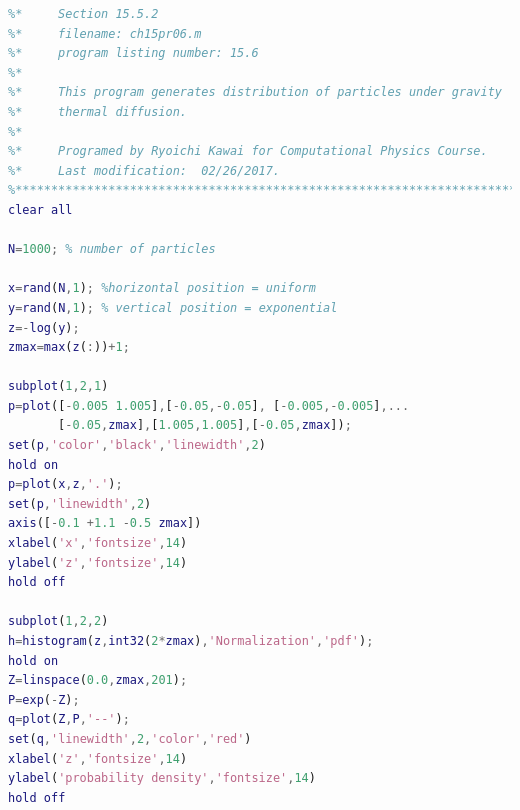 \bigskip
\noindent
\program
\label{prog:sediment}
\footnotesize
\begin{lstlisting}[language=matlab]
%**************************************************************************
%*     Section 15.5.2                                                     *
%*     filename: ch15pr06.m                                               *
%*     program listing number: 15.6                                       *
%*                                                                        *
%*     This program generates distribution of particles under gravity     *
%*     thermal diffusion.                                                 *
%*                                                                        *
%*     Programed by Ryoichi Kawai for Computational Physics Course.       *
%*     Last modification:  02/26/2017.                                    *
%**************************************************************************
clear all

N=1000; % number of particles

x=rand(N,1); %horizontal position = uniform
y=rand(N,1); % vertical position = exponential
z=-log(y);
zmax=max(z(:))+1;

subplot(1,2,1)
p=plot([-0.005 1.005],[-0.05,-0.05], [-0.005,-0.005],...
       [-0.05,zmax],[1.005,1.005],[-0.05,zmax]);
set(p,'color','black','linewidth',2)
hold on
p=plot(x,z,'.');
set(p,'linewidth',2)
axis([-0.1 +1.1 -0.5 zmax])
xlabel('x','fontsize',14)
ylabel('z','fontsize',14)
hold off

subplot(1,2,2)
h=histogram(z,int32(2*zmax),'Normalization','pdf');
hold on
Z=linspace(0.0,zmax,201);
P=exp(-Z);
q=plot(Z,P,'--');
set(q,'linewidth',2,'color','red')
xlabel('z','fontsize',14)
ylabel('probability density','fontsize',14)
hold off
\end{lstlisting}
\normalsize


